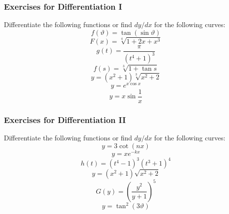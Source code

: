 \documentclass[xcolor=dvipsnames,handout]{beamer}
\begin{document}
\begin{frame}
  \frametitle{Exercises for Differentiation I}
Differentiate the following functions or find $dy/dx$ for the
following curves:
\begin{equation}
  \label{eq:pimexeiz}
  f(\vartheta)=\tan(\sin{}\vartheta)
\end{equation}
\begin{equation}
  \label{eq:oogheica}
  F(x)=\sqrt[4]{1+2x+x^{3}}
\end{equation}
\begin{equation}
  \label{eq:ibagheab}
  g(t)=\frac{\pi}{(t^{4}+1)^{3}}
\end{equation}
\begin{equation}
  \label{eq:oboohoca}
  f(s)=\sqrt[3]{1+\tan{}s}
\end{equation}
\begin{equation}
  \label{eq:choopaib}
  y=(x^{2}+1)\sqrt[3]{x^{2}+2}
\end{equation}
\begin{equation}
  \label{eq:uosiamei}
y=e^{x\cos{}x}  
\end{equation}
\begin{equation}
  \label{eq:oshaiphu}
  y=x\sin\frac{1}{x}
\end{equation}
\end{frame}

\begin{frame}
  \frametitle{Exercises for Differentiation II}
Differentiate the following functions or find $dy/dx$ for the
following curves:
\begin{equation}
  \label{eq:ciukaech}
  y=3\cot(nx)
\end{equation}
\begin{equation}
  \label{eq:oveagooy}
  y=xe^{-kx}
\end{equation}
\begin{equation}
  \label{eq:veeveema}
  h(t)=(t^{4}-1)^{3}(t^{3}+1)^{4}
\end{equation}
\begin{equation}
  \label{eq:athaazui}
  y=(x^{2}+1)\sqrt{x^{2}+2}
\end{equation}
\begin{equation}
  \label{eq:ahgoovim}
  G(y)=\left(\frac{y^{2}}{y+1}\right)^{5}
\end{equation}
\begin{equation}
  \label{eq:gaidaime}
  y=\tan^{2}(3\vartheta)
\end{equation}
\end{frame}
\end{document}
